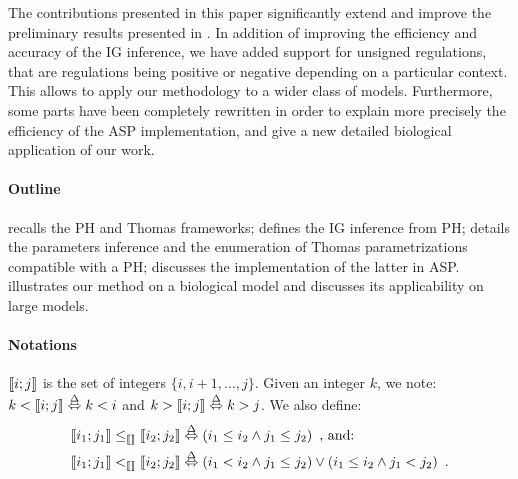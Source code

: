 The contributions presented in this paper significantly extend and improve the preliminary results
presented in \cite{FPIMR12-CMSB}.
In addition of improving the efficiency and accuracy of the IG inference, we have added support for
unsigned regulations, that are regulations being positive or negative depending on a particular
context.
This allows to apply our methodology to a wider class of models.
Furthermore, some parts have been completely rewritten in order to explain more precisely the efficiency of the ASP implementation,
and give a new detailed biological application of our work.

\paragraph{Outline}
 recalls the PH and Thomas frameworks;
 defines the IG inference from PH;
 details the parameters inference and the enumeration of Thomas parametrizations compatible with a PH;
 discusses the implementation of the latter in ASP.
 illustrates our method on a biological model
and discusses its applicability on large models.

\paragraph{Notations}
$\llbracket i ; j \rrbracket$ is the set of integers $\{ i, i+1, \dots, j \}$.
Given an integer $k$, we note: $k < \llbracket i ; j \rrbracket \stackrel{\Delta}\Leftrightarrow k < i$ and $k > \llbracket i ; j \rrbracket \stackrel{\Delta}\Leftrightarrow k > j$.
We also define:
\begin{align*}
  \llbracket i_1 ; j_1 \rrbracket \leq_{\llbracket\rrbracket} \llbracket i_2 ; j_2 \rrbracket &\stackrel{\Delta}\Leftrightarrow (i_1\leq i_2\wedge j_1\leq j_2) \enspace\text{, and:}\\
  \llbracket i_1 ; j_1 \rrbracket <_{\llbracket\rrbracket} \llbracket i_2 ; j_2 \rrbracket &\stackrel{\Delta}\Leftrightarrow (i_1<i_2 \wedge j_1\leq j_2) \vee (i_1\leq i_2\wedge j_1 < j_2) \enspace.
\end{align*}
